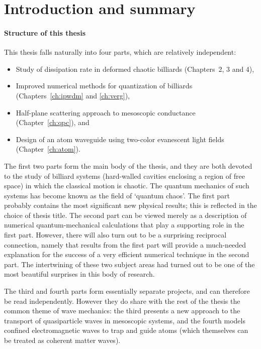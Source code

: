 
\chapter{Introduction and summary}

\subsubsection{Structure of this thesis}

\cite{art1}
This thesis falls naturally into four parts, which are relatively
independent:
\begin{itemize}
\item Study of dissipation rate in deformed chaotic billiards (Chapters~2,
3 and 4),
\item Improved numerical methods for quantization of billiards
(Chapters~\ref{ch:ipwdm} and \ref{ch:verg}),
\item Half-plane scattering
approach to mesoscopic conductance
(Chapter~\ref{ch:qpc}), and
\item Design of an atom waveguide using two-color evanescent light fields
(Chapter~\ref{ch:atom}).
\end{itemize}

The first two parts form the main body of the thesis, and they are both
devoted to the study of billiard systems (hard-walled cavities
enclosing a region of free space)
in which the classical motion is chaotic.
The quantum mechanics of such systems has become known as the field of
`quantum chaos'.
The first part probably contains the most significant new physical results;
this is reflected in the choice of thesis title.
The second part can be viewed merely as a description of numerical
quantum-mechanical calculations that play a
supporting role in the first part.
However, there will also turn out to be a surprising reciprocal connection,
namely that results from the first part will provide a much-needed
explanation for the success of a very efficient numerical technique
in the second part.
The intertwining of these two subject areas had turned out to be one of the
most beautiful surprises in this body of research.

The third and fourth parts form essentially separate projects, and can
therefore be read independently.
However they do share with the rest of the thesis the common theme of
wave mechanics: the third presents a new approach to
the transport of quasiparticle waves in mesoscopic systems,
and the fourth models confined electromagnetic waves to trap and guide atoms
(which themselves can be treated as coherent matter waves).

